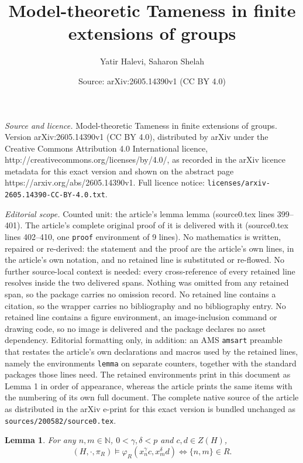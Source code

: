 \documentclass[10pt,a4paper]{amsart}
\title{Model-theoretic Tameness in finite extensions of groups}
\author{Yatir Halevi, Saharon Shelah}
\date{Source: arXiv:2605.14390v1 (CC BY 4.0)}
\newtheorem{lemma}{Lemma}
\begin{document}
\maketitle

\noindent\emph{Source and licence.} Model-theoretic Tameness in finite extensions of groups. Version arXiv:2605.14390v1 (CC BY 4.0), distributed by arXiv under the Creative Commons Attribution 4.0 International licence, http://creativecommons.org/licenses/by/4.0/, as recorded in the arXiv licence metadata for this exact version and shown on the abstract page https://arxiv.org/abs/2605.14390v1. Full licence notice: \texttt{licenses/arxiv-2605.14390-CC-BY-4.0.txt}.\par\smallskip

\noindent\textit{Editorial scope.} Counted unit: the article's lemma lemma (source0.tex lines 399--401). The article's complete original proof of it is delivered with it (source0.tex lines 402--410, one \texttt{proof} environment of 9 lines). No mathematics is written, repaired or re-derived: the statement and the proof are the article's own lines, in the article's own notation, and no retained line is substituted or re-flowed.  No further source-local context is needed: every cross-reference of every retained line resolves inside the two delivered spans.  Nothing was omitted from any retained span, so the package carries no omission record.  No retained line contains a citation, so the wrapper carries no bibliography and no bibliography entry.  No retained line contains a figure environment, an image-inclusion command or drawing code, so no image is delivered and the package declares no asset dependency.  Editorial formatting only, in addition: an AMS \texttt{amsart} preamble that restates the article's own declarations and macros used by the retained lines, namely the environments \texttt{lemma} on separate counters, together with the standard packages those lines need.  The retained environments print in this document as Lemma 1 in order of appearance, whereas the article prints the same items with the numbering of its own full document.  The complete native source of the article as distributed in the arXiv e-print for this exact version is bundled unchanged as \texttt{sources/200582/source0.tex}.
\begin{lemma}
    For any $n, m\in \mathbb{N}$, $0<\gamma,\delta<p$ and $c,d\in Z(H)$, \[(H,\cdot ,\pi_R)\models \varphi_R(x_n^\gamma c,x_m^\delta d)\iff \{n,m\}\in R.\]
\end{lemma}
\end{document}

